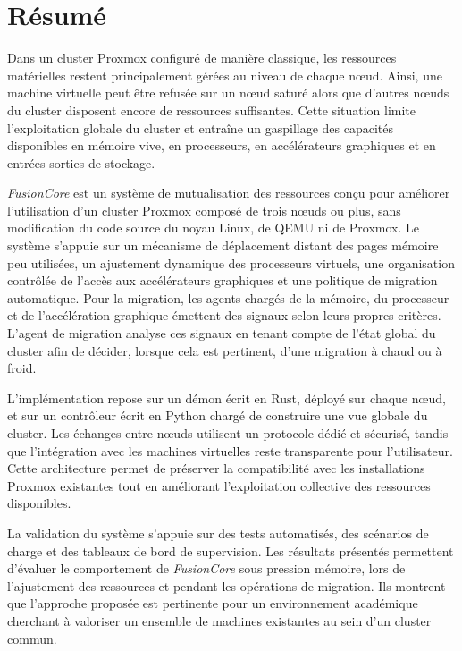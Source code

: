 \documentclass[
    language=french,
    school=estg,
    docstage=final,
    media=paper,
    bookprint=false,
    linkcolor=red!45!black,
    chapterstyle=classic,
    coverstyle=classic,
    aiacknowledgement=false,
    listprefix=false
]{IPLeiriaThesis}
\theoremstyle{definition}
\theoremstyle{plain}
\begin{document}
\chapter*{Résumé}

Dans un cluster Proxmox configuré de manière classique, les ressources matérielles restent principalement gérées au niveau de chaque nœud. Ainsi, une machine virtuelle peut être refusée sur un nœud saturé alors que d'autres nœuds du cluster disposent encore de ressources suffisantes. Cette situation limite l'exploitation globale du cluster et entraîne un gaspillage des capacités disponibles en mémoire vive, en processeurs, en accélérateurs graphiques et en entrées-sorties de stockage.

\emph{FusionCore} est un système de mutualisation des ressources conçu pour améliorer l'utilisation d'un cluster Proxmox composé de trois nœuds ou plus, sans modification du code source du noyau Linux, de QEMU ni de Proxmox. Le système s'appuie sur un mécanisme de déplacement distant des pages mémoire peu utilisées, un ajustement dynamique des processeurs virtuels, une organisation contrôlée de l'accès aux accélérateurs graphiques et une politique de migration automatique. Pour la migration, les agents chargés de la mémoire, du processeur et de l'accélération graphique émettent des signaux selon leurs propres critères. L'agent de migration analyse ces signaux en tenant compte de l'état global du cluster afin de décider, lorsque cela est pertinent, d'une migration à chaud ou à froid.

L'implémentation repose sur un démon écrit en Rust, déployé sur chaque nœud, et sur un contrôleur écrit en Python chargé de construire une vue globale du cluster. Les échanges entre nœuds utilisent un protocole dédié et sécurisé, tandis que l'intégration avec les machines virtuelles reste transparente pour l'utilisateur. Cette architecture permet de préserver la compatibilité avec les installations Proxmox existantes tout en améliorant l'exploitation collective des ressources disponibles.

La validation du système s'appuie sur des tests automatisés, des scénarios de charge et des tableaux de bord de supervision. Les résultats présentés permettent d'évaluer le comportement de \emph{FusionCore} sous pression mémoire, lors de l'ajustement des ressources et pendant les opérations de migration. Ils montrent que l'approche proposée est pertinente pour un environnement académique cherchant à valoriser un ensemble de machines existantes au sein d'un cluster commun.
\end{document}
